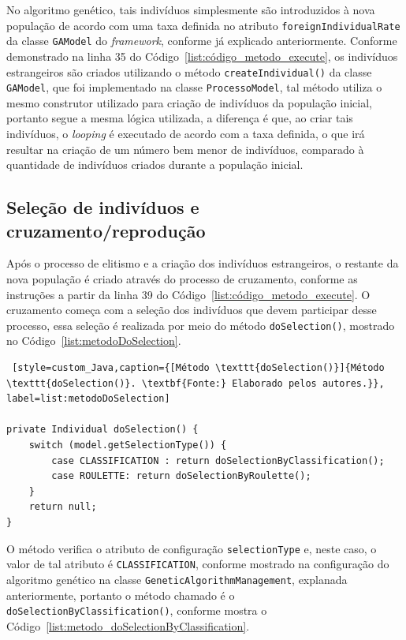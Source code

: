 \par No algoritmo genético, tais indivíduos simplesmente são introduzidos à nova população de acordo com uma taxa definida no 
atributo \texttt{foreignIndividualRate} da classe \texttt{GAModel} do \textit{framework}, conforme já explicado anteriormente. Conforme 
demonstrado na linha 35 do Código~\ref{list:código_metodo_execute}, os indivíduos estrangeiros são criados utilizando o método \texttt{createIndividual()} da classe \texttt{GAModel}, que foi implementado na classe \texttt{ProcessoModel}, 
tal método utiliza o mesmo construtor utilizado para criação de indivíduos da população inicial, portanto segue a mesma lógica utilizada, a diferença é que, ao criar tais indivíduos, o \textit{looping} é executado de acordo com a taxa definida, o que irá resultar na criação de um número bem menor de indivíduos, comparado à quantidade de indivíduos criados durante a população inicial.

\subsection{Seleção de indivíduos e cruzamento/reprodução}  \label{selecao_cruzamento_section}

\par Após o processo de elitismo e a criação dos indivíduos estrangeiros, o restante da nova população é criado através do processo
de cruzamento, conforme as instruções a partir da linha 39 do Código~\ref{list:código_metodo_execute}. O cruzamento começa com a 
seleção dos indivíduos que devem participar desse processo, essa seleção é realizada por meio do método \texttt{doSelection()}, 
mostrado no Código~\ref{list:metodoDoSelection}.

\begin{lstlisting} [style=custom_Java,caption={[Método \texttt{doSelection()}]{Método \texttt{doSelection()}. \textbf{Fonte:} Elaborado pelos autores.}}, label=list:metodoDoSelection] 

private Individual doSelection() {
	switch (model.getSelectionType()) {
		case CLASSIFICATION : return doSelectionByClassification();
		case ROULETTE: return doSelectionByRoulette();
	}
	return null;
}

\end{lstlisting}

\par O método verifica o atributo de configuração \texttt{selectionType} e, neste caso, o valor de tal atributo é 
\texttt{CLASSIFICATION}, conforme mostrado na configuração do algoritmo genético na classe \texttt{GeneticAlgorithmManagement}, 
explanada anteriormente, portanto o método chamado é o \texttt{doSelectionByClassification()}, conforme mostra o Código~\ref{list:metodo_doSelectionByClassification}.

